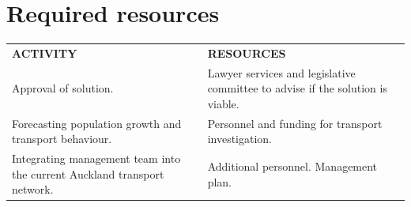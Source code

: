 \documentclass[twoside, a4paper, 11pt]{article}
\begin{document}
\section{Required resources}
\begin{table}[H]
		\centering
		\begin{tabular}{|p{6cm}|p{7cm}|}

			\textbf{ACTIVITY}                                                                 & \textbf{RESOURCES       }                                                                                                                                                                                                                                                                                                                                                                                                                                                       \\
			Approval of solution.                                                    & Lawyer services and legislative committee to advise if the solution is viable.                                                                                                                                                                                                                                                                                                                                                                                         \\
			Forecasting population growth and transport behaviour.                   & Personnel and funding for transport investigation.                                                                                                                                                                                                                                                                                                                                                                                                                     \\
			Integrating management team into the current Auckland transport network. & Additional personnel. Management plan.                                                                                                                                                                                                                                                                                                                                                                                                                                 \\

\end{tabular}
\end{table}
\end{document}
